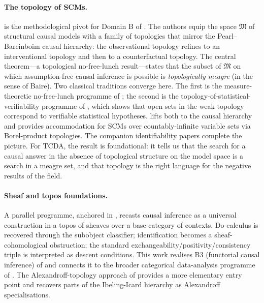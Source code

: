 \paragraph{The topology of SCMs.}
\citet{ibeling2021topological} is the methodological pivot for Domain B
of . The authors equip the space $\mathfrak{M}$ of
structural causal models with a family of topologies that mirror the
Pearl--Bareinboim causal hierarchy: the observational topology refines
to an interventional topology and then to a counterfactual topology.
The central theorem---a topological no-free-lunch result---states that
the subset of $\mathfrak{M}$ on which assumption-free causal inference is
possible is \emph{topologically meagre} (in the sense of Baire). Two
classical traditions converge here. The first is the measure-theoretic
no-free-lunch programme of \citet{oxtoby1971measure,belot2020absolutely};
the second is the topology-of-statistical-verifiability programme of
\citet{dembo1994topological,genin2017topology,genin2018topology,
genin2020statistical,genin2021statistical}, which shows that open sets
in the weak topology correspond to verifiable statistical hypotheses.
\citet{ibeling2021topological} lifts both to the causal hierarchy and
provides accommodation for SCMs over countably-infinite variable sets
via Borel-product topologies. The companion identifiability papers
\citep{ibeling2019open,ibeling2020probabilistic} complete the picture.
For TCDA, the result is foundational: it tells us that the search for a
causal answer in the absence of topological structure on the model
space is a search in a meagre set, and that topology is the right
language for the negative results of the field.

\paragraph{Sheaf and topos foundations.}
A parallel programme, anchored in \citet{mahadevan2021causal,
mahadevan2022universal,mahadevan2025sheaf}, recasts causal inference as
a universal construction in a topos of sheaves over a base category of
contexts. Do-calculus is recovered through the subobject classifier;
identification becomes a sheaf-cohomological obstruction; the standard
exchangeability/positivity/consistency triple is interpreted as
descent conditions. This work realises B3 (functorial causal inference)
of  and connects it to the broader categorical
data-analysis programme of \citet{spivak2014category,curry2014sheaves,
hajij2023topological,papamarkou2024position}.
The Alexandroff-topology approach of \citet{willig2025alexandroff}
provides a more elementary entry point and recovers parts of the
Ibeling-Icard hierarchy as Alexandroff specialisations.

